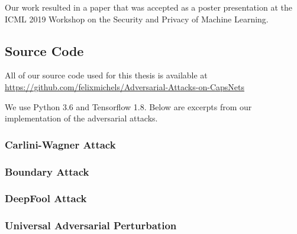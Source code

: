 Our work resulted in a paper \citep*{mine} that was accepted as a poster presentation at the ICML 2019 Workshop on the Security and Privacy of Machine Learning.



\subsection{Source Code}

All of our source code used for this thesis is available at \url{https://github.com/felixmichels/Adversarial-Attacks-on-CapsNets}

We use Python 3.6 and Tensorflow 1.8.
Below are excerpts from our implementation of the adversarial attacks.

\subsubsection{Carlini-Wagner Attack}


\subsubsection{Boundary Attack}


\subsubsection{DeepFool Attack}


\subsubsection{Universal Adversarial Perturbation}





